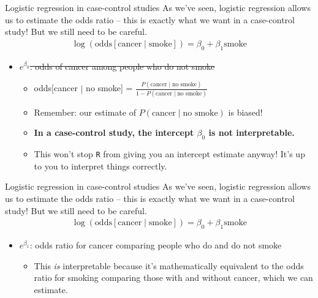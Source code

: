 \documentclass[10pt,t]{beamer}
\begin{document}
\begin{frame}{Logistic regression in case-control studies}
	As we've seen, logistic regression allows us to estimate the odds ratio -- this is exactly what we want in a case-control study! But we still need to be careful.  
	\begin{align*}
		\log(\text{odds}[\text{cancer} \mid \text{smoke}]) = \beta_0 + \beta_1 \text{smoke}
	\end{align*} 
	\vspace{-3 mm}
	
	\begin{itemize}
		\item \sout{$e^{\beta_0}$: odds of cancer among people who do not smoke}
	\medskip
	
	\begin{itemize}
		\item  \normalsize odds[cancer $\mid$ no smoke] = $\frac{P(\text{cancer} \mid \text{no smoke})}{1 - P(\text{cancer} \mid \text{no smoke})}$
		
		\smallskip
		
		\item \normalsize Remember: our estimate of $P(\text{cancer} \mid \text{no smoke})$ is biased!
		 
		\smallskip
		
		\item \normalsize \textbf{In a case-control study, the intercept $\beta_0$ is not interpretable.} 
		
		\smallskip
		
		\item \normalsize	This won't stop \texttt{R} from giving you an intercept estimate anyway! It's up to you to interpret things correctly.
		\end{itemize}
	\end{itemize}
\end{frame}

\begin{frame}{Logistic regression in case-control studies}
	As we've seen, logistic regression allows us to estimate the odds ratio -- this is exactly what we want in a case-control study! But we still need to be careful. 
	\begin{align*}
		\log(\text{odds}[\text{cancer} \mid \text{smoke}]) = \beta_0 + \beta_1 \text{smoke}
	\end{align*}
	
	\vspace{-3 mm}
	
	\begin{itemize}
		
	\item $e^{\beta_1}$: odds ratio for cancer comparing people who do and do not smoke
	\medskip
	
	\begin{itemize}
		\item \normalsize This \textit{is} interpretable because it's mathematically equivalent to the odds ratio for smoking comparing those with and without cancer, which we can estimate. 
	\end{itemize}
	\end{itemize}
\end{frame}
\end{document}
